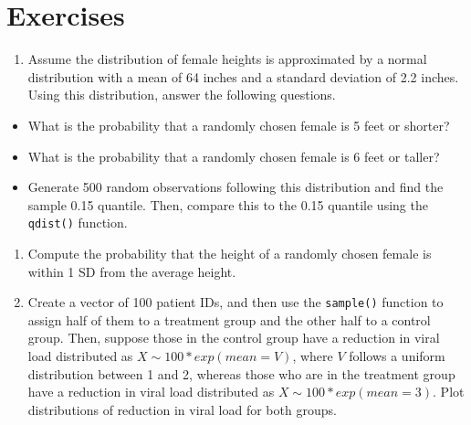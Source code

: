 \documentclass[
  letterpaper,
]{krantz}
\makeatletter
\newenvironment{Shaded}{\begin{snugshade}}{\end{snugshade}}
\newcommand{\CommentTok}[1]{\textcolor[rgb]{0.37,0.37,0.37}{#1}}
\newcommand{\DecValTok}[1]{\textcolor[rgb]{0.68,0.00,0.00}{#1}}
\newcommand{\FunctionTok}[1]{\textcolor[rgb]{0.28,0.35,0.67}{#1}}
\newcommand{\NormalTok}[1]{\textcolor[rgb]{0.00,0.23,0.31}{#1}}
\newcommand{\OtherTok}[1]{\textcolor[rgb]{0.00,0.23,0.31}{#1}}
\newcommand{\SpecialCharTok}[1]{\textcolor[rgb]{0.37,0.37,0.37}{#1}}
\providecommand{\tightlist}{%
  \setlength{\itemsep}{0pt}\setlength{\parskip}{0pt}}\usepackage{longtable,booktabs,array}
\newenvironment{kframe}{%
\medskip{}
\setlength{\fboxsep}{.8em}
 \def\at@end@of@kframe{}%
 \ifinner\ifhmode%
  \def\at@end@of@kframe{\end{minipage}}%
  \begin{minipage}{\columnwidth}%
 \fi\fi%
 \def\FrameCommand##1{\hskip\@totalleftmargin \hskip-\fboxsep
 \colorbox{shadecolor}{##1}\hskip-\fboxsep
     \hskip-\linewidth \hskip-\@totalleftmargin \hskip\columnwidth}%
 \MakeFramed {\advance\hsize-\width
   \@totalleftmargin\z@ \linewidth\hsize
   \@setminipage}}%
 {\par\unskip\endMakeFramed%
 \at@end@of@kframe}
\renewenvironment{Shaded}{\begin{kframe}}{\end{kframe}}
\makeatother
\begin{document}
\begin{Shaded}
\end{Shaded}

\section{Exercises}\label{exercises-6}

\begin{enumerate}
\def\labelenumi{\arabic{enumi}.}
\tightlist
\item
  Assume the distribution of female heights is approximated by a normal
  distribution with a mean of 64 inches and a standard deviation of 2.2
  inches. Using this distribution, answer the following questions.
\end{enumerate}

\begin{itemize}
\item
  What is the probability that a randomly chosen female is 5 feet or
  shorter?
\item
  What is the probability that a randomly chosen female is 6 feet or
  taller?
\item
  Generate 500 random observations following this distribution and find
  the sample 0.15 quantile. Then, compare this to the 0.15 quantile
  using the \texttt{qdist()} function.
\end{itemize}

\begin{enumerate}
\def\labelenumi{\arabic{enumi}.}
\setcounter{enumi}{1}
\item
  Compute the probability that the height of a randomly chosen female is
  within 1 SD from the average height.
\item
  Create a vector of 100 patient IDs, and then use the \texttt{sample()}
  function to assign half of them to a treatment group and the other
  half to a control group. Then, suppose those in the control group have
  a reduction in viral load distributed as \(X \sim 100*exp(mean = V)\),
  where \(V\) follows a uniform distribution between 1 and 2, whereas
  those who are in the treatment group have a reduction in viral load
  distributed as \(X \sim 100*exp(mean = 3)\). Plot distributions of
  reduction in viral load for both groups.
\end{enumerate}
\end{document}
